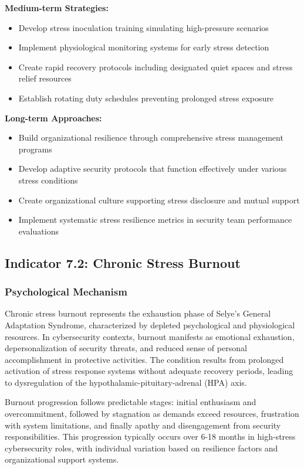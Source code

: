 \documentclass[11pt,a4paper]{article}
\begin{document}
\textbf{Medium-term Strategies:}
\begin{itemize}
\item Develop stress inoculation training simulating high-pressure scenarios
\item Implement physiological monitoring systems for early stress detection
\item Create rapid recovery protocols including designated quiet spaces and stress relief resources
\item Establish rotating duty schedules preventing prolonged stress exposure
\end{itemize}

\textbf{Long-term Approaches:}
\begin{itemize}
\item Build organizational resilience through comprehensive stress management programs
\item Develop adaptive security protocols that function effectively under various stress conditions
\item Create organizational culture supporting stress disclosure and mutual support
\item Implement systematic stress resilience metrics in security team performance evaluations
\end{itemize}

\subsection{Indicator 7.2: Chronic Stress Burnout}

\subsubsection{Psychological Mechanism}

Chronic stress burnout represents the exhaustion phase of Selye's General Adaptation Syndrome, characterized by depleted psychological and physiological resources\cite{maslach2001}. In cybersecurity contexts, burnout manifests as emotional exhaustion, depersonalization of security threats, and reduced sense of personal accomplishment in protective activities. The condition results from prolonged activation of stress response systems without adequate recovery periods, leading to dysregulation of the hypothalamic-pituitary-adrenal (HPA) axis\cite{mcewen2017}.

Burnout progression follows predictable stages: initial enthusiasm and overcommitment, followed by stagnation as demands exceed resources, frustration with system limitations, and finally apathy and disengagement from security responsibilities. This progression typically occurs over 6-18 months in high-stress cybersecurity roles, with individual variation based on resilience factors and organizational support systems\cite{cyberburnout2023}.
\end{document}
